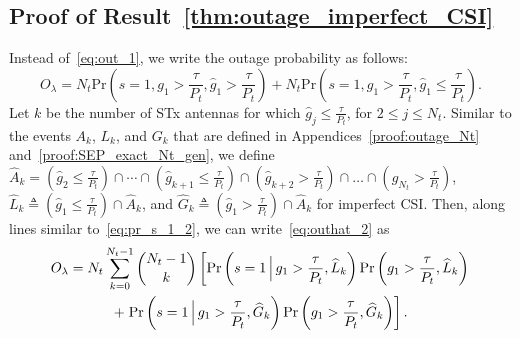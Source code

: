 \documentclass[12pt,draftcls,peerreview,onecolumn]{IEEEtran}
\newcommand{\brac}[1]{\left({#1}\right)}
\newcommand{\define}{\triangleq}
\newcommand{\prob}[1]{\text{Pr}\brac{#1}}
\newcommand{\Given}{\Big\arrowvert}
\newcommand{\nck}[2]{\binom{#1}{#2}}
\newcommand{\setA}{A}
\newcommand{\setAk}{\setA_{k}}
\newcommand{\setAkhat}{\widehat{\setA}_k}
\newcommand{\setG}{G}
\newcommand{\setL}{L}
\newcommand{\setGk}{\setG_k}
\newcommand{\setLk}{\setL_k}
\newcommand{\setGkhat}{\widehat{\setG}_k}
\newcommand{\setLkhat}{\widehat{\setL}_k}
\newcommand{\lam}{\lambda}
\newcommand{\Nt}{{N_t}}
\newcommand{\Pt}{{P_t}}
\newcommand{\puch}{g}
\newcommand{\gk}[1]{{\puch_{#1}}}
\newcommand{\itau}{\tau}
\newcommand{\out}{O}
\newcommand{\taubypt}{\frac{\itau}{\Pt}}
\newcommand{\gkgrtaubypt}[1]{{\gk{#1}}>\taubypt}
\newcommand{\gkhatgrtaubypt}[1]{{\gkhat{#1}}>\taubypt}
\newcommand{\gkhatlttaubypt}[1]{{\gkhat{#1}}\leq\taubypt}
\newcommand{\outlam}{\out_{\lam}}
\newcommand{\ghat}{\hat{\puch}}
\newcommand{\gkhat}[1]{\ghat_{#1}}
\begin{document}
\subsection{Proof of Result~\ref{thm:outage_imperfect_CSI}}
\label{proof:outage_imperfect_CSI}
Instead of~\eqref{eq:out_1}, we write the outage probability as follows: 
\begin{equation}
\outlam=\Nt\text{Pr}\brac{s=1,\gk{1}>\taubypt,\gkhat{1}>\taubypt} + \Nt\text{Pr}\brac{s=1,\gk{1}>\taubypt,\gkhat{1}\leq\taubypt}.
\label{eq:outhat_2}
\end{equation}
Let $k$ be the number of STx antennas for which $\gkhatlttaubypt{j}$, for $2\leq j \leq\Nt$. Similar to the events $\setAk$, $\setLk$,  and  $\setGk$ that are defined in Appendices~\ref{proof:outage_Nt} and~\ref{proof:SEP_exact_Nt_gen}, we define $\setAkhat=\left(  \gkhatlttaubypt{2}\right)\cap\cdots\cap\left(\gkhatlttaubypt{k+1}\right)\cap\left(\gkhatgrtaubypt{k+2}\right)\cap\dots\cap\left(\gkhatgrtaubypt{\Nt}\right)$, $\setLkhat\define\left(\gkhatlttaubypt{1}\right)\cap\setAkhat$, and $\setGkhat\define\left(\gkhatgrtaubypt{1}\right)\cap\setAkhat$ for imperfect CSI. Then, along lines similar to~\eqref{eq:pr_s_1_2}, we can write~\eqref{eq:outhat_2}  as
%
\begin{multline}
\outlam =\Nt\sum_{k=0}^{\Nt-1}\nck{\Nt-1}{k}\left[ \prob{s = 1 \Given \gkgrtaubypt{1},\setLkhat} \prob{\gkgrtaubypt{1},\setLkhat} \right. \\  +\left.
\prob{s = 1 \Given\gkgrtaubypt{1}, \setGkhat } \prob{\gkgrtaubypt{1},\setGkhat}\right]. 
\label{eq:pr_s_1_2_imp}
\end{multline}
%
\end{document}
